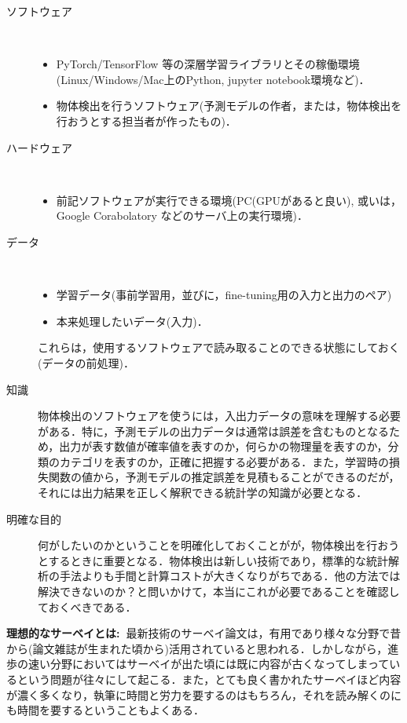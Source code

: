 \documentclass[originalpaper]{jsaiart}     %
\begin{document}
\begin{description}
    \item[ソフトウェア]　
    \begin{itemize}
        \item PyTorch/TensorFlow 等の深層学習ライブラリとその稼働環境(Linux/Windows/Mac上のPython, jupyter notebook環境など)．
        \item 物体検出を行うソフトウェア(予測モデルの作者，または，物体検出を行おうとする担当者が作ったもの)．
    \end{itemize}
    \item[ハードウェア]　
    \begin{itemize}
        \item 前記ソフトウェアが実行できる環境(PC(GPUがあると良い), 或いは，Google Corabolatory などのサーバ上の実行環境)．
    \end{itemize}
    \item[データ]　
    \begin{itemize}
        \item 学習データ(事前学習用，並びに，fine-tuning用の入力と出力のペア)
        \item 本来処理したいデータ(入力)．
    \end{itemize}
    これらは，使用するソフトウェアで読み取ることのできる状態にしておく(データの前処理)．
    \item[知識] 物体検出のソフトウェアを使うには，入出力データの意味を理解する必要がある．特に，予測モデルの出力データは通常は誤差を含むものとなるため，出力が表す数値が確率値を表すのか，何らかの物理量を表すのか，分類のカテゴリを表すのか，正確に把握する必要がある．また，学習時の損失関数の値から，予測モデルの推定誤差を見積もることができるのだが，それには出力結果を正しく解釈できる統計学の知識が必要となる．
    \item[明確な目的] 何がしたいのかということを明確化しておくことがが，物体検出を行おうとするときに重要となる．物体検出は新しい技術であり，標準的な統計解析の手法よりも手間と計算コストが大きくなりがちである．他の方法では解決できないのか？と問いかけて，本当にこれが必要であることを確認しておくべきである．
\end{description}

{\bf 理想的なサーベイとは:\ }最新技術のサーベイ論文は，有用であり様々な分野で昔から(論文雑誌が生まれた頃から)活用されていると思われる．しかしながら，進歩の速い分野においてはサーベイが出た頃には既に内容が古くなってしまっているという問題が往々にして起こる．また，とても良く書かれたサーベイほど内容が濃く多くなり，執筆に時間と労力を要するのはもちろん，それを読み解くのにも時間を要するということもよくある．
\end{document}
